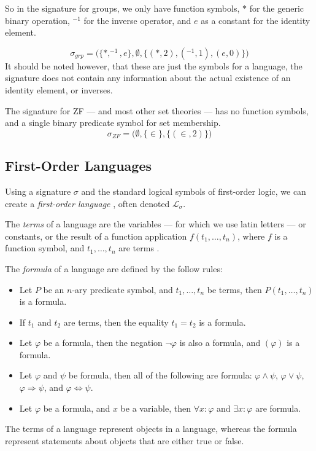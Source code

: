\documentclass[11pt]{report}
\theoremstyle{definition}
\theoremstyle{theorem}
\theoremstyle{lemma}
\begin{document}
So in the signature for groups, we only have function symbols, $*$ for the generic binary operation, $^{-1}$ for the inverse operator, and $e$ as a constant for the identity element.

$$\sigma_{\mathit{grp}} = \big(\{*,^{-1}, e\},\emptyset,\{(*, 2), (^{-1}, 1),(e,0)\}\big)$$
It should be noted however, that these are just the symbols for a language, the signature does not contain any information about the actual existence of an identity element, or inverses.

The signature for ZF --- and most other set theories --- has no function symbols, and a single binary predicate symbol for set membership.
$$\sigma_{\mathit{ZF}} = \big(\emptyset,\{\in\},\{(\in, 2)\})$$

\subsection{First-Order Languages}
Using a signature $\sigma$ and the standard logical symbols of first-order logic, we can create a \emph{first-order language} \cite[ch.~1]{stanmodel}, often denoted $\mathcal{L}_\sigma$.

The \emph{terms} of a language are the variables --- for which we use latin letters --- or constants, or the result of a function application $f(t_1,\ldots, t_n)$, where $f$ is a function symbol, and $t_1,\ldots,t_n$ are terms \cite[ch.~1.3]{selinger}.

The \emph{formula} of a language are defined \cite[ch~1.4]{selinger} by the follow rules:
\begin{itemize}
  \item Let $P$ be an $n$-ary predicate symbol, and $t_1,\ldots,t_n$ be terms, then $P(t_1,\ldots,t_n)$ is a formula.
  \item If $t_1$ and $t_2$ are terms, then the equality $t_1 = t_2$ is a formula.
  \item Let $\varphi$ be a formula, then the negation $\neg\varphi$ is also a formula, and $(\varphi)$ is a formula.
  \item Let $\varphi$ and $\psi$ be formula, then all of the following are formula: $\varphi\wedge\psi$, $\varphi\vee\psi$, $\varphi\Rightarrow\psi$, and $\varphi\Leftrightarrow\psi$.
  \item Let $\varphi$ be a formula, and $x$ be a variable, then $\forall x:\varphi$ and $\exists x:\varphi$ are formula.
\end{itemize}
The terms of a language represent objects in a language, whereas the formula represent statements about objects that are either true or false. 
\end{document}
